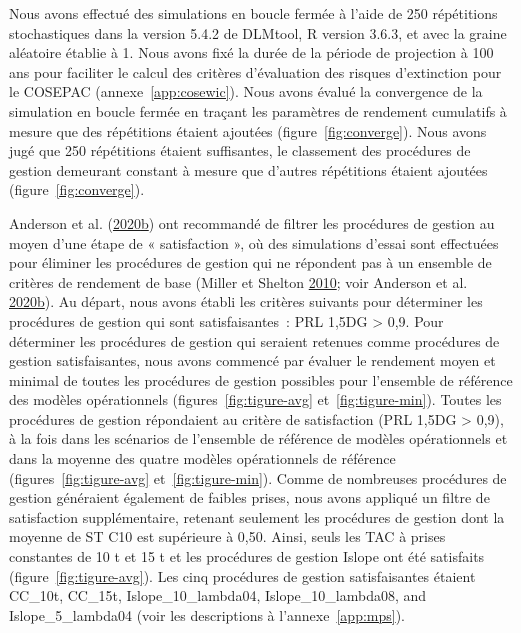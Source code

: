 \documentclass[french,11pt]{book}
\begin{document}
Nous avons effectué des simulations en boucle fermée à l'aide de 250 répétitions stochastiques dans la version 5.4.2 de DLMtool, R version 3.6.3, et avec la graine aléatoire établie à 1. Nous avons fixé la durée de la période de projection à 100 ans pour faciliter le calcul des critères d'évaluation des risques d'extinction pour le COSEPAC (annexe~\ref{app:cosewic}). Nous avons évalué la convergence de la simulation en boucle fermée en traçant les paramètres de rendement cumulatifs à mesure que des répétitions étaient ajoutées (figure~\ref{fig:converge}). Nous avons jugé que 250 répétitions étaient suffisantes, le classement des procédures de gestion demeurant constant à mesure que d'autres répétitions étaient ajoutées (figure~\ref{fig:converge}).

Anderson et al. (\protect\hyperlink{ref-anderson2020gfmp}{2020}\protect\hyperlink{ref-anderson2020gfmp}{b}) ont recommandé de filtrer les procédures de gestion au moyen d'une étape de « satisfaction », où des simulations d'essai sont effectuées pour éliminer les procédures de gestion qui ne répondent pas à un ensemble de critères de rendement de base (Miller et Shelton \protect\hyperlink{ref-miller2010}{2010}; voir Anderson et al. \protect\hyperlink{ref-anderson2020gfmp}{2020}\protect\hyperlink{ref-anderson2020gfmp}{b}). Au départ, nous avons établi les critères suivants pour déterminer les procédures de gestion qui sont satisfaisantes~: PRL 1,5DG \textgreater{} 0,9. Pour déterminer les procédures de gestion qui seraient retenues comme procédures de gestion satisfaisantes, nous avons commencé par évaluer le rendement moyen et minimal de toutes les procédures de gestion possibles pour l'ensemble de référence des modèles opérationnels (figures~\ref{fig:tigure-avg} et~\ref{fig:tigure-min}). Toutes les procédures de gestion répondaient au critère de satisfaction (PRL 1,5DG \textgreater{} 0,9), à la fois dans les scénarios de l'ensemble de référence de modèles opérationnels et dans la moyenne des quatre modèles opérationnels de référence (figures~\ref{fig:tigure-avg} et~\ref{fig:tigure-min}). Comme de nombreuses procédures de gestion généraient également de faibles prises, nous avons appliqué un filtre de satisfaction supplémentaire, retenant seulement les procédures de gestion dont la moyenne de ST C10 est supérieure à 0,50. Ainsi, seuls les TAC à prises constantes de 10 t et 15 t et les procédures de gestion Islope ont été satisfaits (figure~\ref{fig:tigure-avg}). Les cinq procédures de gestion satisfaisantes étaient CC\_10t, CC\_15t, Islope\_10\_lambda04, Islope\_10\_lambda08, and Islope\_5\_lambda04 (voir les descriptions à l'annexe~\ref{app:mps}).
\end{document}
